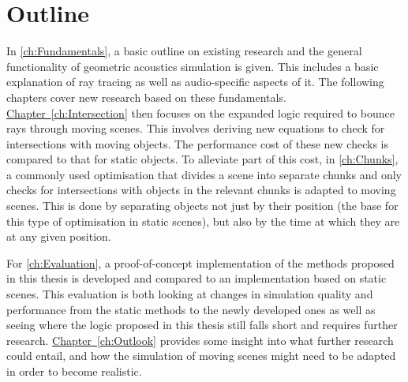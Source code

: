 \section{Outline}

In \autoref{ch:Fundamentals}, a basic outline on existing research and the general functionality of geometric acoustics simulation is given.
This includes a basic explanation of ray tracing as well as audio-specific aspects of it.
The following chapters cover new research based on these fundamentals.
\newline
\hyperref[ch:Intersection]{Chapter~\ref*{ch:Intersection}} then focuses on the expanded logic required to bounce rays through moving scenes.
This involves deriving new equations to check for intersections with moving objects.
The performance cost of these new checks is compared to that for static objects.
\newline
To alleviate part of this cost, in \autoref{ch:Chunks},
a commonly used optimisation that divides a scene into separate chunks
and only checks for intersections with objects in the relevant chunks is adapted to moving scenes.
This is done by separating objects not just by their position (the base for this type of optimisation in static scenes),
but also by the time at which they are at any given position.
\iffalse
    \newline
    irs ch5
\fi
\newline
For \autoref{ch:Evaluation}, a proof-of-concept implementation of the methods proposed in this thesis is developed
and compared to an implementation based on static scenes.
This evaluation is both looking at changes in simulation quality and performance from the static methods to the newly developed ones
as well as seeing where the logic proposed in this thesis still falls short and requires further research.
\newline
\hyperref[ch:Outlook]{Chapter~\ref*{ch:Outlook}} provides some insight into what further research could entail,
and how the simulation of moving scenes might need to be adapted in order to become realistic.
